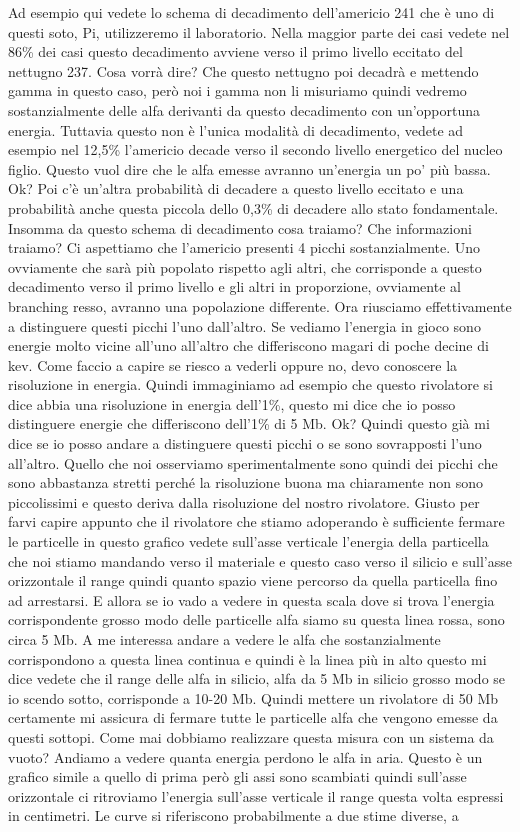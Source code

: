 Ad esempio qui vedete lo schema di decadimento dell'americio 241 che è uno di questi soto, Pi, utilizzeremo il laboratorio. Nella maggior parte dei casi vedete nel 86\% dei casi questo decadimento avviene verso il primo livello eccitato del nettugno 237. Cosa vorrà dire? Che questo nettugno poi decadrà e mettendo gamma in questo caso, però noi i gamma non li misuriamo quindi vedremo sostanzialmente delle alfa derivanti da questo decadimento con un'opportuna energia. Tuttavia questo non è l'unica modalità di decadimento, vedete ad esempio nel 12,5\% l'americio decade verso il secondo livello energetico del nucleo figlio. Questo vuol dire che le alfa emesse avranno un'energia un po' più bassa. Ok? Poi c'è un'altra probabilità di decadere a questo livello eccitato e una probabilità anche questa piccola dello 0,3\% di decadere allo stato fondamentale. Insomma da questo schema di decadimento cosa traiamo? Che informazioni traiamo? Ci aspettiamo che l'americio presenti 4 picchi sostanzialmente. Uno ovviamente che sarà più popolato rispetto agli altri, che corrisponde a questo decadimento verso il primo livello e gli altri in proporzione, ovviamente al branching resso, avranno una popolazione differente. Ora riusciamo effettivamente a distinguere questi picchi l'uno dall'altro. Se vediamo l'energia in gioco sono energie molto vicine all'uno all'altro che differiscono magari di poche decine di kev. Come faccio a capire se riesco a vederli oppure no, devo conoscere la risoluzione in energia. Quindi immaginiamo ad esempio che questo rivolatore si dice abbia una risoluzione in energia dell'1\%, questo mi dice che io posso distinguere energie che differiscono dell'1\% di 5 Mb. Ok? Quindi questo già mi dice se io posso andare a distinguere questi picchi o se sono sovrapposti l'uno all'altro. Quello che noi osserviamo sperimentalmente sono quindi dei picchi che sono abbastanza stretti perché la risoluzione buona ma chiaramente non sono piccolissimi e questo deriva dalla risoluzione del nostro rivolatore. Giusto per farvi capire appunto che il rivolatore che stiamo adoperando è sufficiente fermare le particelle in questo grafico vedete sull'asse verticale l'energia della particella che noi stiamo mandando verso il materiale e questo caso verso il silicio e sull'asse orizzontale il range quindi quanto spazio viene percorso da quella particella fino ad arrestarsi. E allora se io vado a vedere in questa scala dove si trova l'energia corrispondente grosso modo delle particelle alfa siamo su questa linea rossa, sono circa 5 Mb. A me interessa andare a vedere le alfa che sostanzialmente corrispondono a questa linea continua e quindi è la linea più in alto questo mi dice vedete che il range delle alfa in silicio, alfa da 5 Mb in silicio grosso modo se io scendo sotto, corrisponde a 10-20 Mb. Quindi mettere un rivolatore di 50 Mb certamente mi assicura di fermare tutte le particelle alfa che vengono emesse da questi sottopi. Come mai dobbiamo realizzare questa misura con un sistema da vuoto? Andiamo a vedere quanta energia perdono le alfa in aria. Questo è un grafico simile a quello di prima però gli assi sono scambiati quindi sull'asse orizzontale ci ritroviamo l'energia sull'asse verticale il range questa volta espressi in centimetri. Le curve si riferiscono probabilmente a due stime diverse, a 